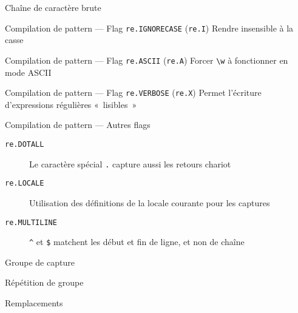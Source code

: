 \begin{frame}{Chaîne de caractère brute}
\end{frame}

\begin{frame}{Compilation de pattern --- Flag \texttt{re.IGNORECASE} (\texttt{re.I})}
  Rendre insensible à la casse
\end{frame}

\begin{frame}{Compilation de pattern --- Flag \texttt{re.ASCII} (\texttt{re.A})}
  Forcer \texttt{\textbackslash w} à fonctionner en mode ASCII
\end{frame}

\begin{frame}{Compilation de pattern --- Flag \texttt{re.VERBOSE} (\texttt{re.X})}
  Permet l'écriture d'expressions régulières «~lisibles~»
\end{frame}

\begin{frame}{Compilation de pattern --- Autres flags}
  \begin{description}
  \item[\texttt{re.DOTALL}] Le caractère spécial \texttt{.} capture aussi les retours chariot
  \item[\texttt{re.LOCALE}] Utilisation des définitions de la locale courante pour les captures
  \item[\texttt{re.MULTILINE}] \texttt{\^{}} et \texttt{\$} matchent les début et fin de ligne, et non de chaîne
  \end{description}
\end{frame}

\begin{frame}{Groupe de capture}
\end{frame}

\begin{frame}{Répétition de groupe}
\end{frame}

\begin{frame}{Remplacements}
\end{frame}

